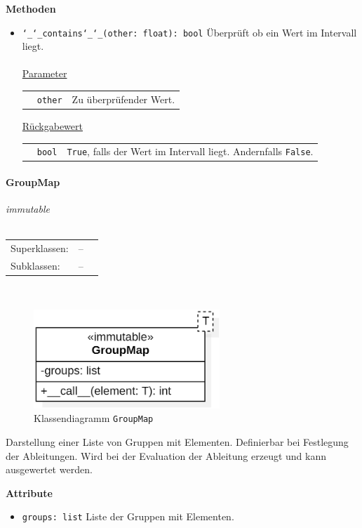 \documentclass{article}
\newcommand{\classheader}[2][]{\paragraph{#2}
\mbox{}\textit{#1}\\\\}
\begin{document}
\textbf{{Methoden}}
\begin{itemize}
\item \texttt{\char`_\char`_contains\char`_\char`_(other: float): bool} \newline Überprüft ob ein Wert im Intervall liegt.
\\\\
\underline{{Parameter}}

\begin{tabular}{lll}
 & \texttt{other} & Zu überprüfender Wert. \\
\end{tabular}

\underline{{Rückgabewert}}

\begin{tabular}{lll}
 & \texttt{bool} & \texttt{True}, falls der Wert im Intervall liegt. Andernfalls \texttt{False}. \\
\end{tabular}
\end{itemize}


\newpage
\classheader[\flqq{}immutable\frqq]{GroupMap}\label{cls:GroupMap}
\begin{tabular}{lll}
 Superklassen: & --\\
 Subklassen: & --\\
\end{tabular}\\
\begin{figure}[H]%
    \centering
    \includegraphics[width=7cm]{entwurf/Entwurf_dokument/img/cls/model/GroupMap.png}
    \caption{Klassendiagramm \texttt{GroupMap}}
\end{figure}

Darstellung einer Liste von Gruppen mit Elementen. Definierbar bei Festlegung der Ableitungen. Wird bei der Evaluation der Ableitung erzeugt und kann ausgewertet werden.
\newline \newline

\textbf{Attribute}
\begin{itemize}
\item \texttt{groups: list} \newline Liste der Gruppen mit Elementen.
\\\\
\end{itemize}
\end{document}
